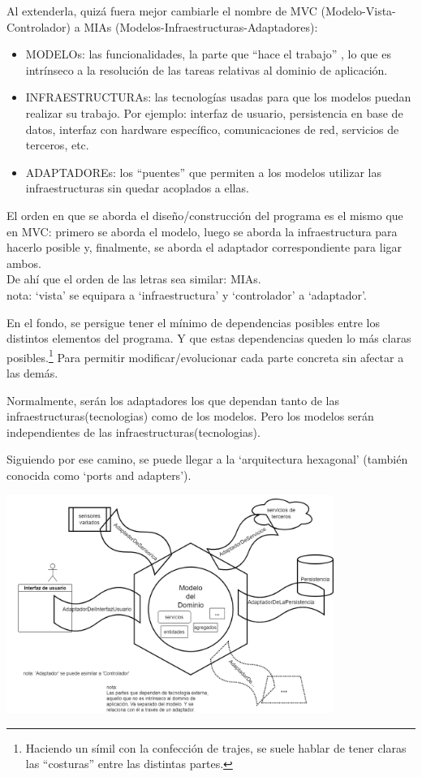 \documentclass[spanish,12pt,a4paper,final,oneside]{book}
\begin{document}
Al extenderla, quizá fuera mejor cambiarle el nombre de MVC ({\footnotesize Modelo-Vista-Controlador}) a MIAs ({\footnotesize Modelos-Infraestructuras-Adaptadores}):
\begin{itemize}

\item MODELOs: las funcionalidades, la parte que ``hace el trabajo'' , lo que es intrínseco a la resolución de las tareas relativas al dominio de aplicación.

\item INFRAESTRUCTURAs: las tecnologías usadas para que los modelos puedan realizar su trabajo. Por ejemplo: interfaz de usuario, persistencia en base de datos, interfaz con hardware específico, comunicaciones de red, servicios de terceros, etc.

\item ADAPTADOREs: los ``puentes'' que permiten a los modelos utilizar las infraestructuras sin quedar acoplados a ellas.

\end{itemize}

El orden en que se aborda el diseño/construcción del programa es el mismo que en MVC: primero se aborda el modelo, luego se aborda la infraestructura para hacerlo posible y, finalmente, se aborda el adaptador correspondiente para ligar ambos. 
\\De ahí que el orden de las letras sea similar: MIAs.
\\{\footnotesize nota: `vista' se equipara a `infraestructura' y `controlador' a `adaptador'.}

En el fondo, se persigue tener el mínimo de dependencias posibles entre los distintos elementos del programa. Y que estas dependencias queden lo más claras posibles.\footnote{Haciendo un símil con la confección de trajes, se suele hablar de tener claras las ``costuras'' entre las distintas partes.} Para permitir modificar/evolucionar cada parte concreta sin afectar a las demás.

Normalmente, serán los adaptadores los que dependan tanto de las infraestructuras(tecnologias) como de los modelos. Pero los modelos serán independientes de las infraestructuras(tecnologias). 

Siguiendo por ese camino, se puede llegar a la `arquitectura hexagonal' (también conocida como `ports and adapters').
\begin{center}\includegraphics[width=0.8\textwidth]{Arquitectura Hexagonal}\end{center}
\end{document}
